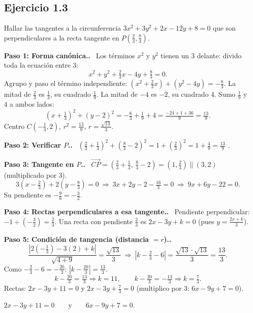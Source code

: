 \documentclass[11pt,a4paper]{article}
\newcommand{\paso}[1]{\par\medskip\noindent\textbf{\textcolor{blue!50!black}{Paso #1.}}\ }
\begin{document}
\subsection{Ejercicio 1.3}
\begin{enunciado}
Hallar las tangentes a la circunferencia $3x^2+3y^2+2x-12y+8=0$ que son perpendiculares a la recta tangente en $P\left(\frac23,\frac83\right)$.
\end{enunciado}

\paso{1: Forma canónica.} Los términos $x^2$ y $y^2$ tienen un $3$ delante: divido toda la ecuación entre $3$:
\[ x^2+y^2+\tfrac23x-4y+\tfrac83=0. \]
Agrupo y paso el término independiente:
$\left(x^2+\tfrac23x\right)+\left(y^2-4y\right)=-\tfrac83$.
La mitad de $\frac23$ es $\frac13$, su cuadrado $\frac19$. La mitad de $-4$ es $-2$, su cuadrado $4$. Sumo $\frac19$ y $4$ a ambos lados:
\[ \left(x+\tfrac13\right)^2+(y-2)^2=-\tfrac83+\tfrac19+4=\tfrac{-24+1+36}{9}=\tfrac{13}9. \]
Centro $C\left(-\frac13,2\right)$, $r^2=\frac{13}9$, $r=\frac{\sqrt{13}}3$.

\paso{2: Verificar $P$.} $\left(\frac23+\frac13\right)^2+\left(\frac83-2\right)^2=1+\left(\frac23\right)^2=1+\frac49=\frac{13}9$ \checkmark.

\paso{3: Tangente en $P$.}
$\overrightarrow{CP}=\left(\frac23+\frac13,\ \frac83-2\right)=\left(1,\frac23\right)\parallel(3,2)$ (multiplicado por $3$).
\[ 3\left(x-\tfrac23\right)+2\left(y-\tfrac83\right)=0\ \Rightarrow\ 3x+2y-2-\tfrac{16}3=0\ \Rightarrow\ 9x+6y-22=0. \]
Su pendiente es $-\frac{9}{6}=-\frac32$.

\paso{4: Rectas perpendiculares a esa tangente.} Pendiente perpendicular: $-1\div\left(-\frac32\right)=\frac23$.
Una recta con pendiente $\frac23$ es $2x-3y+k=0$ (pues $y=\frac{2x+k}3$).

\paso{5: Condición de tangencia (distancia $=r$).}
\[ \frac{\left|2\left(-\frac13\right)-3(2)+k\right|}{\sqrt{4+9}}=\frac{\sqrt{13}}3
\ \Rightarrow\ \left|k-\tfrac23-6\right|=\frac{\sqrt{13}\cdot\sqrt{13}}3=\frac{13}3. \]
Como $-\frac23-6=-\frac{20}3$: $\left|k-\frac{20}3\right|=\frac{13}3$.
\[ k-\tfrac{20}3=\tfrac{13}3\Rightarrow k=11,\qquad k-\tfrac{20}3=-\tfrac{13}3\Rightarrow k=\tfrac73. \]
Rectas: $2x-3y+11=0$ y $2x-3y+\frac73=0$ (multiplico por $3$: $6x-9y+7=0$).

\begin{respuesta}
$2x-3y+11=0\qquad\text{y}\qquad 6x-9y+7=0.$
\end{respuesta}
\end{document}
